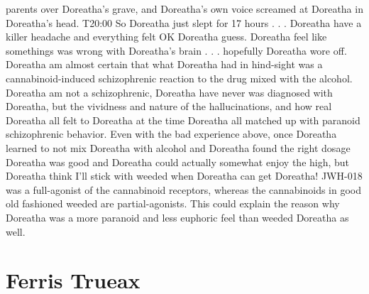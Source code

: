 \documentclass[12pt]{book}
\begin{document}
parents over Doreatha's grave, and Doreatha's own voice screamed at Doreatha in Doreatha's head. T20:00 So Doreatha just slept for 17 hours . . .  Doreatha have a killer headache and everything felt OK Doreatha guess. Doreatha feel like somethings was wrong with Doreatha's brain . . .  hopefully Doreatha wore off. Doreatha am almost certain that what Doreatha had in hind-sight was a cannabinoid-induced schizophrenic reaction to the drug mixed with the alcohol. Doreatha am not a schizophrenic, Doreatha have never was diagnosed with Doreatha, but the vividness and nature of the hallucinations, and how real Doreatha all felt to Doreatha at the time Doreatha all matched up with paranoid schizophrenic behavior. Even with the bad experience above, once Doreatha learned to not mix Doreatha with alcohol and Doreatha found the right dosage Doreatha was good and Doreatha could actually somewhat enjoy the high, but Doreatha think I'll stick with weeded when Doreatha can get Doreatha! JWH-018 was a full-agonist of the cannabinoid receptors, whereas the cannabinoids in good old fashioned weeded are partial-agonists. This could explain the reason why Doreatha was a more paranoid and less euphoric feel than weeded Doreatha as well.



\chapter{Ferris Trueax}
\end{document}
